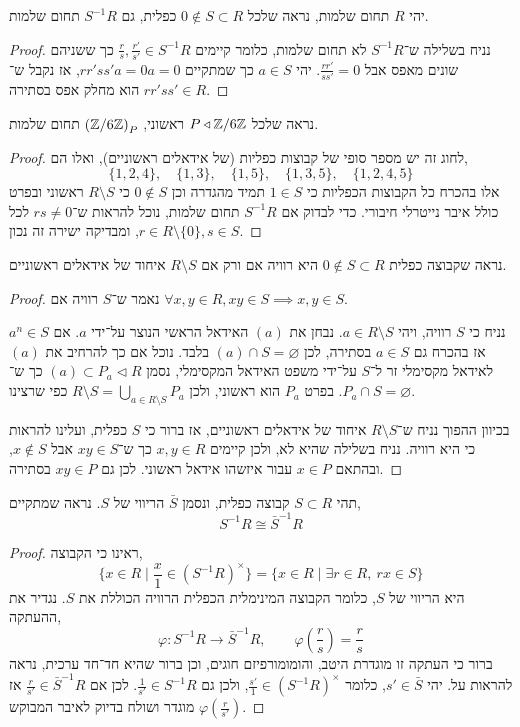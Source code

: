 \question{}
\subquestion{}
יהי $R$ תחום שלמות,
נראה שלכל $0 \notin S \subset R$ כפלית, גם $S^{-1} R$ תחום שלמות.
\begin{proof}
	נניח בשלילה ש־$S^{-1} R$ לא תחום שלמות, כלומר קיימים $\frac{r}{s}, \frac{r'}{s'} \in S^{-1} R$ כך ששניהם שונים מאפס אבל $\frac{r r'}{s s'} = 0$.
	יהי $a \in S$ כך שמתקיים $r r' s s' a = 0 a = 0$, אז נקבל ש־$r r' s s' \in R$ הוא מחלק אפס בסתירה.
\end{proof}

\subquestion{}
נראה שלכל $P \triangleleft \mathbb{Z} / 6 \mathbb{Z}$ ראשוני, ${(\mathbb{Z} / 6 \mathbb{Z})}_P$ תחום שלמות.
\begin{proof}
	לחוג זה יש מספר סופי של קבוצות כפליות (של אידאלים ראשוניים), ואלו הם,
	\[
		\{ 1, 2, 4 \},
		\quad
		\{ 1, 3 \},
		\quad
		\{ 1, 5 \},
		\quad
		\{ 1, 3, 5 \},
		\quad
		\{ 1, 2, 4, 5 \}
	\]
	אלו בהכרח כל הקבוצות הכפליות כי $1 \in S$ תמיד מהגדרה וכן $0 \notin S$ כי $R \setminus S$ ראשוני ובפרט כולל איבר נייטרלי חיבורי.
	כדי לבדוק אם $S^{-1} R$ תחום שלמות, נוכל להראות ש־$r s \ne 0$ לכל $r \in R \setminus \{ 0 \}, s \in S$, ומבדיקה ישירה זה נכון.
\end{proof}

\question{}
נראה שקבוצה כפלית $0 \notin S \subset R$ היא רוויה אם ורק אם $R \setminus S$ איחוד של אידאלים ראשוניים.
\begin{proof}
	נאמר ש־$S$ רוויה אם $\forall x, y \in R, x y \in S \implies x, y \in S$.

	נניח כי $S$ רוויה, ויהי $a \in R \setminus S$.
	נבחן את $(a)$ האידאל הראשי הנוצר על־ידי $a$.
	אם $a^n \in S$ אז בהכרח גם $a \in S$ בסתירה, לכן $(a) \cap S = \varnothing$ בלבד.
	נוכל אם כך להרחיב את $(a)$ לאידאל מקסימלי זר ל־$S$ על־ידי משפט האידאל המקסימלי, נסמן $(a) \subset P_a \triangleleft R$ כך ש־$P_a \cap S = \varnothing$.
	בפרט $P_a$ הוא ראשוני, ולכן $R \setminus S = \bigcup_{a \in R \setminus S} P_a$ כפי שרצינו.

	בכיוון ההפוך נניח ש־$R \setminus S$ איחוד של אידאלים ראשוניים, אז ברור כי $S$ כפלית, ועלינו להראות כי היא רוויה.
	נניח בשלילה שהיא לא, ולכן קיימים $x, y \in R$ כך ש־$x y \in S$ אבל $x \notin S$, ובהתאם $x \in P$ עבור איזשהו אידאל ראשוני.
	לכן גם $x y \in P$ בסתירה.
\end{proof}

\question{}
תהי $S \subset R$ קבוצה כפלית, ונסמן $\bar{S}$ הריווי של $S$.
נראה שמתקיים,
\[
	S^{-1} R
	\cong \bar{S}^{-1} R
\]
\begin{proof}
	ראינו כי הקבוצה,
	\[
		\{ x \in R \mid \frac{x}{1} \in {(S^{-1} R)}^\times \}
		= \{ x \in R \mid \exists r \in R,\ r x \in S \}
	\]
	היא הריווי של $S$, כלומר הקבוצה המינימלית הכפלית הרוויה הכוללת את $S$.
	נגדיר את ההעתקה,
	\[
		\varphi : S^{-1} R \to \bar{S}^{-1} R,
		\qquad
		\varphi(\frac{r}{s}) = \frac{r}{s}
	\]
	ברור כי העתקה זו מוגדרת היטב, והומומורפיזם חוגים, וכן ברור שהיא חד־חד ערכית, נראה להראות על.
	יהי $s' \in \bar{S}$, כלומר $\frac{s'}{1} \in {(S^{-1} R)}^\times$, ולכן גם $\frac{1}{s'} \in S^{-1} R$.
	לכן אם $\frac{r}{s'} \in \bar{S}^{-1} R$ אז $\varphi(\frac{r}{s'})$ מוגדר ושולח בדיוק לאיבר המבוקש.
\end{proof}


